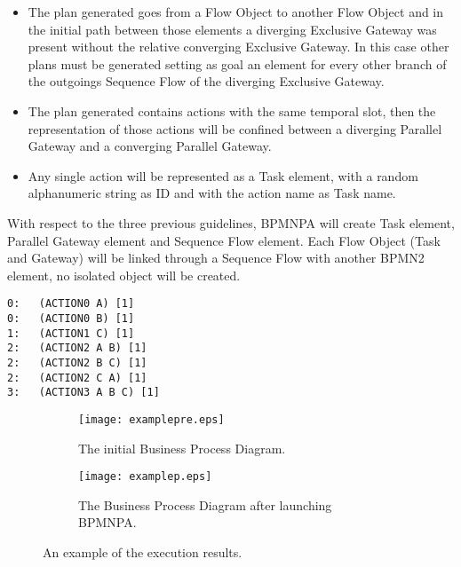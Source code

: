 \begin{itemize}  
\item The plan generated goes from a Flow Object to another Flow Object and in the initial path between those elements a diverging Exclusive Gateway was present without the relative converging Exclusive Gateway. In this case other plans must be generated setting as goal an element for every other branch of the outgoings Sequence Flow of the diverging Exclusive Gateway.

\item The plan generated contains actions with the same temporal slot, then the representation of those actions will be confined between a diverging Parallel Gateway and a converging Parallel Gateway.

\item Any single action will be represented as a Task element, with a random alphanumeric string as ID and with the action name as Task name.
\end{itemize}


With respect to the three previous guidelines, BPMNPA will create Task element, Parallel Gateway element and Sequence Flow element. Each Flow Object (Task and Gateway) will be linked through a Sequence Flow with another BPMN2 element, no isolated object will be created.

\newpage

\begin{lstlisting}[caption=Planner output example. In this case the first and the second actions can be executed in any order.]
0:   (ACTION0 A) [1]
0:   (ACTION0 B) [1]
1:   (ACTION1 C) [1]
2:   (ACTION2 A B) [1]
2:   (ACTION2 B C) [1]
2:   (ACTION2 C A) [1]
3:   (ACTION3 A B C) [1]
\end{lstlisting}


\begin{figure}[h!]
	\centering
	\begin{subfigure}[b]{0.7\linewidth}
    	\texttt{[image: examplepre.eps]}
    	\caption{The initial Business Process Diagram.}
  	\end{subfigure}
	\begin{subfigure}[b]{1\linewidth}
    	\texttt{[image: examplep.eps]}
    	\caption{The Business Process Diagram after launching BPMNPA.}
  	\end{subfigure}
	\caption{An example of the execution results.}
	\label{fig:coffee}
\end{figure}